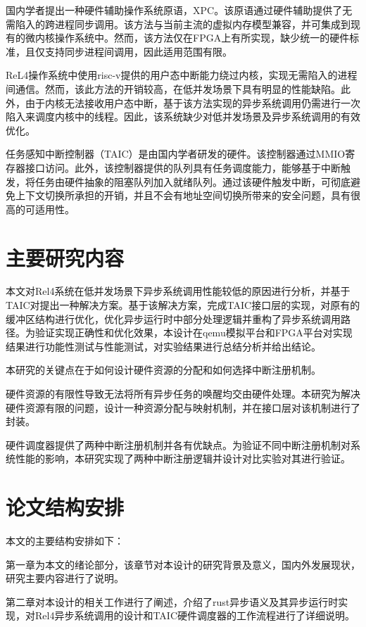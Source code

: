 国内学者提出一种硬件辅助操作系统原语，XPC\cite{XPC2019}。该原语通过硬件辅助提供了无需陷入的跨进程同步调用。该方法与当前主流的虚拟内存模型兼容，并可集成到现有的微内核操作系统中。然而，该方法仅在FPGA上有所实现，缺少统一的硬件标准，且仅支持同步进程间调用，因此适用范围有限。

ReL4操作系统中使用risc-v提供的用户态中断能力绕过内核，实现无需陷入的进程间通信。然而，该此方法的开销较高，在低并发场景下具有明显的性能缺陷。此外，由于内核无法接收用户态中断，基于该方法实现的异步系统调用仍需进行一次陷入来调度内核中的线程。因此，该系统缺少对低并发场景及异步系统调用的有效优化。

任务感知中断控制器（TAIC）\cite{taic2024}是由国内学者研发的硬件。该控制器通过MMIO寄存器接口访问。此外，该控制器提供的队列具有任务调度能力，能够基于中断触发，将任务由硬件抽象的阻塞队列加入就绪队列。通过该硬件触发中断，可彻底避免上下文切换所承担的开销，并且不会有地址空间切换所带来的安全问题，具有很高的可适用性。

\section{主要研究内容}

本文对Rel4系统在低并发场景下异步系统调用性能较低的原因进行分析，并基于TAIC对提出一种解决方案。基于该解决方案，完成TAIC接口层的实现，对原有的缓冲区结构进行优化，优化异步运行时中部分处理逻辑并重构了异步系统调用路径。为验证实现正确性和优化效果，本设计在qemu模拟平台和FPGA平台对实现结果进行功能性测试与性能测试，对实验结果进行总结分析并给出结论。

本研究的关键点在于如何设计硬件资源的分配和如何选择中断注册机制。

硬件资源的有限性导致无法将所有异步任务的唤醒均交由硬件处理。本研究为解决硬件资源有限的问题，设计一种资源分配与映射机制，并在接口层对该机制进行了封装。

硬件调度器提供了两种中断注册机制并各有优缺点。为验证不同中断注册机制对系统性能的影响，本研究实现了两种中断注册逻辑并设计对比实验对其进行验证。


\section{论文结构安排}

本文的主要结构安排如下：

第一章为本文的绪论部分，该章节对本设计的研究背景及意义，国内外发展现状，研究主要内容进行了说明。

第二章对本设计的相关工作进行了阐述，介绍了rust异步语义及其异步运行时实现，对Rel4异步系统调用的设计和TAIC硬件调度器的工作流程进行了详细说明。

